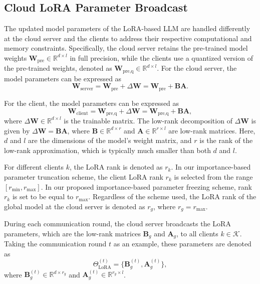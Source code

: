 \documentclass[journal]{IEEEtran}
\begin{document}
\subsection{Cloud LoRA Parameter Broadcast}
The updated model parameters of the LoRA-based LLM are handled differently at the cloud server and the clients to address their respective computational and memory constraints. Specifically, the cloud server retains the pre-trained model weights \(\mathbf{W}_{\text{pre}}\in \mathbb{R}^{d \times l}\) in full precision, while the clients use a quantized version of the pre-trained weights, denoted as \(\mathbf{W}_{\text{pre,q}}\in \mathbb{R}^{d \times l}\). For the cloud server, the model parameters can be expressed as
\begin{equation}
\mathbf{W}_{\text{server}} = \mathbf{W}_{\text{pre}} + \Delta \mathbf{W} = \mathbf{W}_{\text{pre}} + \mathbf{B}\mathbf{A}.
\end{equation}

For the client, the model parameters can be expressed as
\begin{equation}
\mathbf{W}_{\text{client}} = \mathbf{W}_{\text{pre,q}} + \Delta \mathbf{W} = \mathbf{W}_{\text{pre,q}} + \mathbf{B}\mathbf{A},
\end{equation}
where \(\Delta \mathbf{W} \in \mathbb{R}^{d \times l}\) is the trainable matrix. The low-rank decomposition of \(\Delta \mathbf{W}\) is given by \(\Delta \mathbf{W} = \mathbf{B}\mathbf{A}\), where \(\mathbf{B} \in \mathbb{R}^{d \times r}\) and \(\mathbf{A} \in \mathbb{R}^{r \times l}\) are low-rank matrices. Here, \(d\) and \(l\) are the dimensions of the model's weight matrix, and \(r\) is the rank of the low-rank approximation, which is typically much smaller than both \(d\) and \(l\).

For different clients \(k\), the LoRA rank is denoted as \(r_k\). In our importance-based parameter truncation scheme, the client LoRA rank \(r_k\) is selected from the range \([r_{\text{min}}, r_{\text{max}}]\). In our proposed importance-based parameter freezing scheme, rank \(r_k\) is set to be equal to \(r_{\text{max}}\). Regardless of the scheme used, the LoRA rank of the global model at the cloud server is denoted as \(r_g\), where \(r_g = r_{\text{max}}\).

During each communication round, the cloud server broadcasts the LoRA parameters, which are the low-rank matrices \(\mathbf{B}_g\) and \(\mathbf{A}_g\), to all clients \(k \in \mathcal{K}\). Taking the communication round \(t\) as an example, these parameters are denoted as
\begin{equation}
\Theta_{\text{LoRA}}^{(t)} = \{\mathbf{B}_g^{(t)},\mathbf{A}_g^{(t)}\},
\end{equation}
where \(\mathbf{B}_g^{(t)} \in \mathbb{R}^{d \times r_g}\) and \(\mathbf{A}_g^{(t)} \in \mathbb{R}^{r_g \times l}\).
\end{document}
